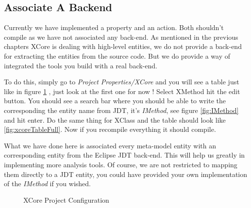 \subsection{Associate A Backend}\label{subsection:backEnd}
        
        Currently we have implemented a property and an action. Both shouldn't compile as we have not associated any back-end.
As mentioned in the previous chapters XCore is dealing with high-level entities, we do not provide a back-end for extracting the entities from the source
code. But we do provide a way of integrated the tools you build with a real back-end. 
        
        To do this, simply go to \textit{Project Properties/XCore} and you will see a table just like in figure \ref{fig:xcoreTable} , just look at the first one for now ! Select 
XMethod hit the edit button. You should see a search bar where you should be able to write the corresponding the entity name from JDT, it's \textit{IMethod}, see figure \ref{fig:IMethod} and hit enter. Do the
same thing for XClass and the table should look like \ref{fig:xcoreTableFull}. Now if you recompile everything it should compile.

        What we have done here is associated every meta-model entity with an corresponding entity from the Eclipse JDT back-end. This will help us greatly in implementing more analysis tools. Of course, we 
are not restricted to mapping them directly to a JDT entity, you could have provided your own implementation of the \textit{IMethod} if you wished.

        \begin{figure}
             \centering
             \caption{XCore Project Configuration}
             \label{fig:xcoreTable}
        \end{figure}    

